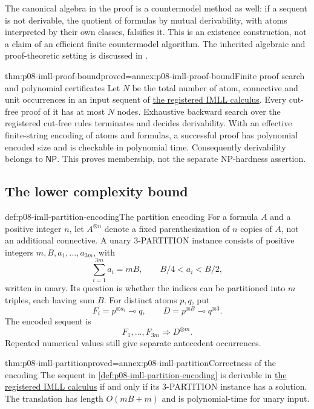 The canonical algebra in the proof is a countermodel method as well:
if a sequent is not derivable, the quotient of formulas by mutual
derivability, with atoms interpreted by their own classes, falsifies it.
This is an existence construction, not a claim of an efficient finite
countermodel algorithm. The inherited algebraic and proof-theoretic
setting is discussed in \cite{Girard1987,GalatosJipsenKowalskiOno2007}.

\begin{hbtheorem}{thm:p08-imll-proof-bound}{proved=annex:p08-imll-proof-bound}{Finite proof search and polynomial certificates}
Let \(N\) be the total number of atom, connective and unit occurrences
in an input sequent of \hyperref[sheet:imll]{the registered IMLL calculus}. Every cut-free proof of it
has at most \(N\) nodes. Exhaustive backward search over the registered
cut-free rules terminates and decides derivability. With an effective
finite-string encoding of atoms and formulas, a successful proof has
polynomial encoded size and is checkable in polynomial time.
Consequently derivability belongs to \(\mathsf{NP}\).
This proves membership, not the separate NP-hardness assertion.
\end{hbtheorem}

\subsection{The lower complexity bound}

\begin{hbdefinition}{def:p08-imll-partition-encoding}{The partition encoding}
For a formula \(A\) and a positive integer \(n\), let \(A^{\otimes n}\)
denote a fixed parenthesization of \(n\) copies of \(A\), not an additional
connective.  A unary 3-PARTITION instance consists of positive integers
\(m,B,a_1,\ldots,a_{3m}\), with
\[
 \sum_{i=1}^{3m}a_i=mB,\qquad B/4<a_i<B/2,
\]
written in unary.  Its question is whether the indices can be partitioned
into \(m\) triples, each having sum \(B\).  For distinct atoms \(p,q\), put
\[
 F_i=p^{\otimes a_i}\multimap q,\qquad
 D=p^{\otimes B}\multimap q^{\otimes3}.
\]
The encoded sequent is
\[
 F_1,\ldots,F_{3m}\Rightarrow D^{\otimes m}.
\]
Repeated numerical values still give separate antecedent occurrences.
\end{hbdefinition}

\begin{hbtheorem}{thm:p08-imll-partition}{proved=annex:p08-imll-partition}{Correctness of the encoding}
The sequent in \cref{def:p08-imll-partition-encoding} is derivable in
\hyperref[sheet:imll]{the registered IMLL calculus} if and only if its
3-PARTITION instance has a solution.  The translation has length
\(O(mB+m)\) and is polynomial-time for unary input.
\end{hbtheorem}

